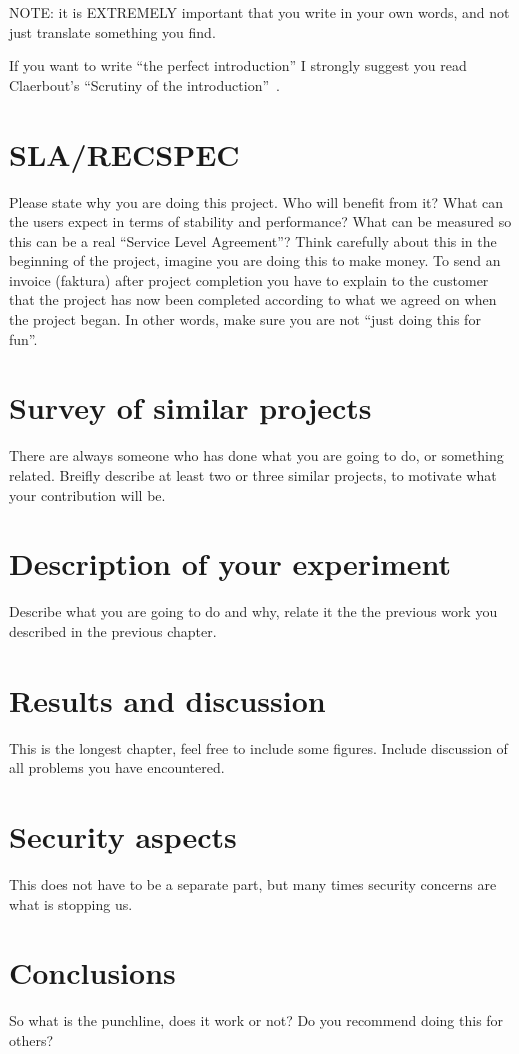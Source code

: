 NOTE: it is EXTREMELY important that you write in your own words, and not
just translate something you find. 

If you want to write ``the perfect introduction'' I strongly suggest you
read Claerbout's ``Scrutiny of the introduction''~\cite{Claerbout:95}.

\section{SLA/RECSPEC}

Please state why you are doing this project. Who will benefit from it? What
can the users expect in terms of stability and performance? What can be
measured so this can be a real ``Service Level Agreement''? Think carefully
about this in the beginning of the project, imagine you are doing this to
make money. To send an invoice (faktura) after project completion you have
to explain to the customer that the project has now been completed
according to what we agreed on when the project began. In other words, make
sure you are not ``just doing this for fun''.

\section{Survey of similar projects}

There are always someone who has done what you are going to do, or
something related. Breifly describe at least two or three similar projects,
to motivate what your contribution will be.

\section{Description of your experiment}

Describe what you are going to do and why, relate it the the previous work
you described in the previous chapter.

\section{Results and discussion}

This is the longest chapter, feel free to include some figures. Include
discussion of all problems you have encountered.

\section{Security aspects}

This does not have to be a separate part, but many times security concerns
are what is stopping us.

\section{Conclusions}

So what is the punchline, does it work or not? Do you recommend doing this
for others?





